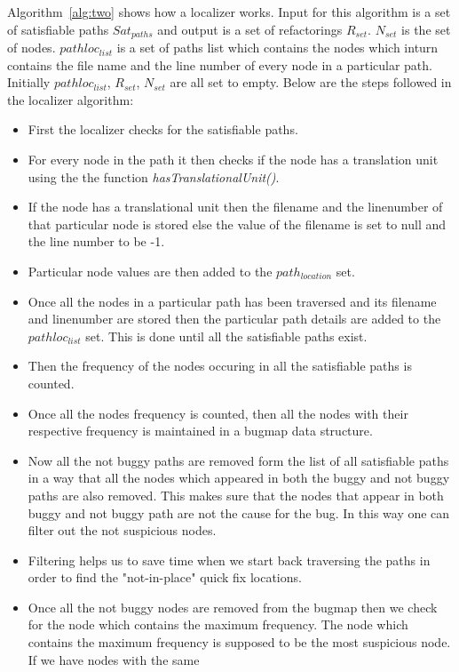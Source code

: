 Algorithm~\ref{alg:two} shows how a localizer works. Input for this algorithm is a set 
of satisfiable paths $Sat_{paths} $ and output is a set of refactorings $R_{set}$.
$N_{set}$ is the set of nodes. $pathloc_{list}$ is a set of paths list which contains
the nodes which inturn contains the file name and the line number of every node in 
a particular path. Initially $pathloc_{list}$, $R_{set}$, $N_{set}$ are all set to empty.
Below are the steps followed in the localizer algorithm:
\begin{itemize}
 \item First the localizer checks for the satisfiable paths.
 \item For every node in the path it then checks if the node has a translation unit using the 
 the function \emph{hasTranslationalUnit()}.
 \item If the node has a translational unit then the filename and the linenumber
 of that particular node is stored else the value of the filename is set to null and 
 the line number to be -1. 
 \item Particular node values are then added to the $path_{location}$ set.
 \item Once all the nodes in a particular path has been traversed and its filename and
 linenumber are stored then the particular path details are added to the $pathloc_{list}$
 set. This is done until all the satisfiable paths exist.
 \item Then the frequency of the nodes occuring in all the satisfiable paths is counted.
 \item Once all the nodes frequency is counted, then all the nodes with their respective
 frequency is maintained in a bugmap data structure.
 \item Now all the not buggy paths are removed form the list of all satisfiable paths in a way
 that all the nodes which appeared in both the buggy and not buggy paths are also removed.
 This makes sure that the nodes that appear in both buggy and not buggy path are
 not the cause for the bug. In this way one can filter out the not suspicious nodes.
 \item Filtering helps us to save time when we start back traversing the paths in order
 to find the "not-in-place" quick fix locations. 
 \item Once all the not buggy nodes are removed from the bugmap then we check for the
 node which contains the maximum frequency. The node which contains the maximum
 frequency is supposed to be the most suspicious node. If we have nodes with the same

\end{itemize}
